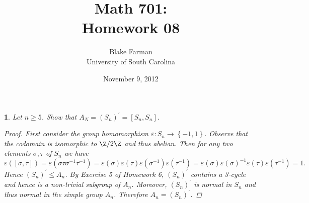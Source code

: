 \documentclass[10pt]{amsart}
\author{Blake Farman\\University of South Carolina}
\title{Math 701:\\Homework 08}
\date{November 9, 2012}
\begin{document}
\maketitle

\newtheorem{thm}{}
\newtheorem{lem}{Lemma}

\begin{thm}
  Let $n \geq 5$.
  Show that $A_N = (S_n)^\prime = [S_n, S_n]$.
  \begin{proof}
    First consider the group homomorphism $\varepsilon \colon S_n \rightarrow \left\{-1,1\right\}$.
    Observe that the codomain is isomorphic to $\Z/2\Z$ and thus abelian.
    Then for any two elements $\sigma, \tau$ of $S_n$ we have 
    $$
    \varepsilon\left([\sigma,\tau]\right) = \varepsilon\left(\sigma\tau\sigma^{-1}\tau^{-1}\right) 
    = \varepsilon\left(\sigma\right)\varepsilon\left(\tau\right)\varepsilon\left(\sigma^{-1}\right)\varepsilon\left(\tau^{-1}\right) 
    = \varepsilon\left(\sigma\right)\varepsilon\left(\sigma\right)^{-1}\varepsilon\left(\tau\right)\varepsilon\left(\tau^{-1}\right) 
    = 1.
    $$
    Hence $(S_n)^\prime \leq A_n$.
    By Exercise 5 of Homework 6, $(S_n)^\prime$ contains a 3-cycle and hence is a non-trivial subgroup of $A_n$.
    Moreover, $(S_n)^\prime$ is normal in $S_n$ and thus normal in the simple group $A_n$.
    Therefore $A_n = (S_n)^\prime$.
  \end{proof}
\end{thm}
\end{document}
